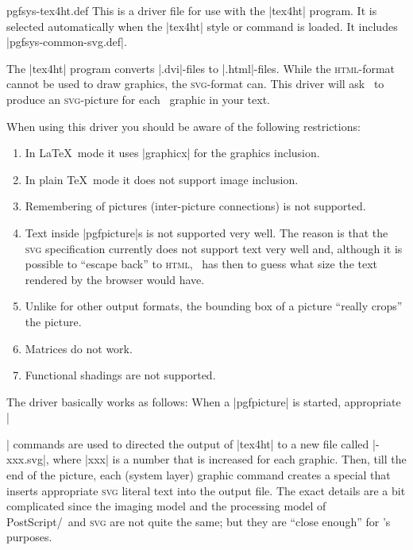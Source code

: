 \begin{filedescription}{pgfsys-tex4ht.def}
    This is a driver file for use with the |tex4ht| program. It is selected
    automatically when the |tex4ht| style or command is loaded. It includes
    |pgfsys-common-svg.def|.

    The |tex4ht| program converts |.dvi|-files to |.html|-files. While the
    \textsc{html}-format cannot be used to draw graphics, the
    \textsc{svg}-format can. This driver will ask \pgfname\ to produce an
    \textsc{svg}-picture for each \pgfname\ graphic in your text.

    When using this driver you should be aware of the following restrictions:
    \begin{enumerate}
        \item In \LaTeX\ mode it uses |graphicx| for the graphics inclusion.
        \item In plain \TeX\ mode it does not support image inclusion.
        \item Remembering of pictures (inter-picture connections) is not
            supported.
        \item Text inside |pgfpicture|s is not supported very well. The
            reason is that the \textsc{svg} specification currently does not
            support text very well and, although it is  possible to ``escape
            back'' to \textsc{html}, \tikzname\ has then to guess what size
            the text rendered by the browser would have.
        \item Unlike for other output formats, the bounding box of a picture
            ``really crops'' the picture.
        \item Matrices do not work.
        \item Functional shadings are not supported.
    \end{enumerate}

    The driver basically works as follows: When a |{pgfpicture}| is started,
    appropriate |\special| commands are used to directed the output of |tex4ht|
    to a new file called |\jobname-xxx.svg|, where |xxx| is a number that is
    increased for each graphic. Then, till the end of the picture, each (system
    layer) graphic command creates a special that inserts appropriate
    \textsc{svg} literal text into the output file. The exact details are a bit
    complicated since the imaging model and the processing model of
    PostScript/\pdf\ and \textsc{svg} are not quite the same; but they are
    ``close enough'' for \pgfname's purposes.


\end{filedescription}
